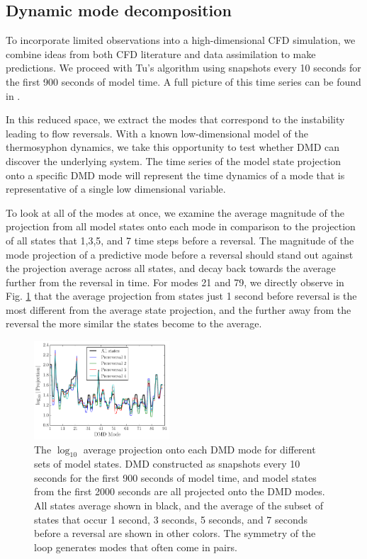 \subsection*{Dynamic mode decomposition}
\label{dmd_section}

To incorporate limited observations into a high-dimensional CFD simulation, we combine ideas from both CFD literature and data assimilation to make predictions.
We proceed with Tu's algorithm using snapshots every 10 seconds for the first 900 seconds of model time.
A full picture of this time series can be found in .

In this reduced space, we extract the modes that correspond to the instability leading to flow reversals.
With a known low-dimensional model of the thermosyphon dynamics, we take this opportunity to test whether DMD can discover the underlying system.
The time series of the model state projection onto a specific DMD mode will represent the time dynamics of a mode that is representative of a single low dimensional variable.

To look at all of the modes at once, we examine the average magnitude of the projection from all model states onto each mode in comparison to the projection of all states that 1,3,5, and 7 time steps before a reversal.
The magnitude of the mode projection of a predictive mode before a reversal should stand out against the projection average across all states, and decay back towards the average further from the reversal in time.
For modes 21 and 79, we directly observe in Fig. \ref{fig:DMD_modes} that the average projection from states just 1 second before reversal is the most different from the average state projection, and the further away from the reversal the more similar the states become to the average.

\begin{figure}[h]
  \centering
  \includegraphics[width=0.45\textwidth]{../figures/2015-10-02-12-51-DMD_modes_pre_reversals.pdf}
  \caption[]{
    The $\log_{10}$ average projection onto each DMD mode for different sets of model states.
    DMD constructed as snapshots every 10 seconds for the first 900 seconds of model time, and model states from the first 2000 seconds are all projected onto the DMD modes.
    All states average shown in black, and the average of the subset of states that occur 1 second, 3 seconds, 5 seconds, and 7 seconds before a reversal are shown in other colors.
    The symmetry of the loop generates modes that often come in pairs.
      }
  \label{fig:DMD_modes}
\end{figure}

